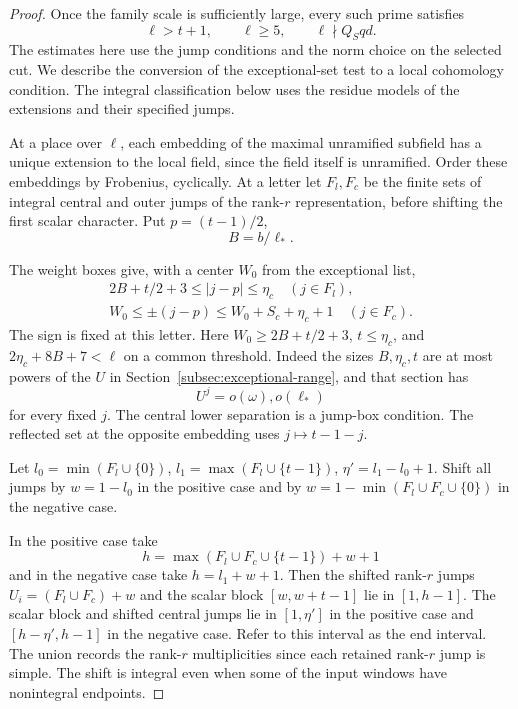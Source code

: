 \begin{proof}
Once the family scale is sufficiently large, every such prime satisfies
\[
 \ell>t+1,\qquad \ell\ge5,\qquad \ell\nmid Q_Sqd.
\]
The estimates here use the jump conditions and the norm choice on
the selected cut. We describe the conversion of the exceptional-set
test to a local cohomology condition. The integral classification below uses the residue models of the
extensions and their specified jumps.

At a place over \(\ell\), each embedding of the maximal unramified
subfield has a unique extension to the local field, since the field
itself is unramified. Order these embeddings by Frobenius, cyclically.
At a letter let \(F_l,F_c\) be the finite sets of integral central and
outer jumps of the rank-\(r\) representation, before shifting the
first scalar character. Put \(p=(t-1)/2\),
\[
 B=b/\ell_*.
\]

The weight boxes give, with a center \(W_0\) from the exceptional list,
\[
 \begin{gathered}
 2B+t/2+3\le |j-p|\le\eta_c \quad(j\in F_l),\\
 W_0\le \pm(j-p)\le W_0+S_c+\eta_c+1 \quad(j\in F_c).
 \end{gathered}
\]
The sign is fixed at this letter. Here
\(W_0\ge 2B+t/2+3\), \(t\le\eta_c\), and
\(2\eta_c+8B+7<\ell\) on a common threshold. Indeed the
sizes \(B,\eta_c,t\) are at most powers of the
\(U\) in Section~\ref{subsec:exceptional-range}, and
that section has
\[
 U^j=o(\omega),o(\ell_*)
\]
for every fixed
\(j\). The central lower separation is a jump-box condition.
The reflected set at the opposite embedding uses \(j\mapsto t-1-j\).

Let \(l_0=\min(F_l\cup\{0\})\),
\(l_1=\max(F_l\cup\{t-1\})\), \(\eta'=l_1-l_0+1\).
Shift all jumps by \(w=1-l_0\) in the positive case
and by \(w=1-\min(F_l\cup F_c\cup\{0\})\) in the negative case.

In the positive case take
\[
 h=\max(F_l\cup F_c\cup\{t-1\})+w+1
\]
and in the negative case take \(h=l_1+w+1\). Then the
shifted rank-\(r\) jumps \(U_i=(F_l\cup F_c)+w\) and the scalar
block \([w,w+t-1]\) lie in \([1,h-1]\). The scalar block and
shifted central jumps lie in \([1,\eta']\) in the positive case
and \([h-\eta',h-1]\) in the negative case. Refer to this
interval as the end interval. The union records the rank-\(r\)
multiplicities since each retained rank-\(r\) jump is simple.
The shift is integral even when some of the input windows have
nonintegral endpoints.


\end{proof}
